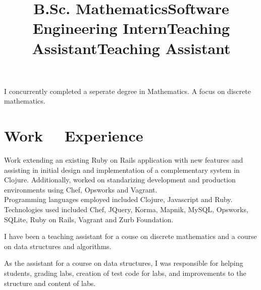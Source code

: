 \documentclass[margintitle,line]{res}
\renewcommand{\subsection}[1]{\section{\normalfont #1}}
\begin{document}
\begin{resume}
\title{B.Sc. Mathematics}
\begin{position}
   I concurrently completed a seperate degree in Mathematics. A focus on discrete mathematics.
\end{position}



\section{Work \ \ Experience}

\title{Software Engineering Intern}
\begin{position}
 Work extending an existing Ruby on Rails application with new features and assisting in initial design and implementation of a complementary system in  Clojure. Additionally, worked on standarizing development and production environments using Chef, Opsworks and Vagrant. \\
 Programming languages employed included Clojure, Javascript and Ruby. \\
 Technologies used included Chef, JQuery, Korma, Mapnik, MySQL, Opsworks, SQLite, Ruby on Rails, Vagrant and Zurb Foundation.
\end{position}

\title{Teaching Assistant}
\begin{position}
 I have been a teaching assistant for a couse on discrete mathematics and a course on data structures and algorithms.
\end{position}

\title{Teaching Assistant}
\begin{position}
 As the assistant for a course on data structures, I was responsible for helping students, grading labs, creation of test code for labs, and improvements to the structure and content of labs.
\end{position}


\end{resume}
\end{document}
